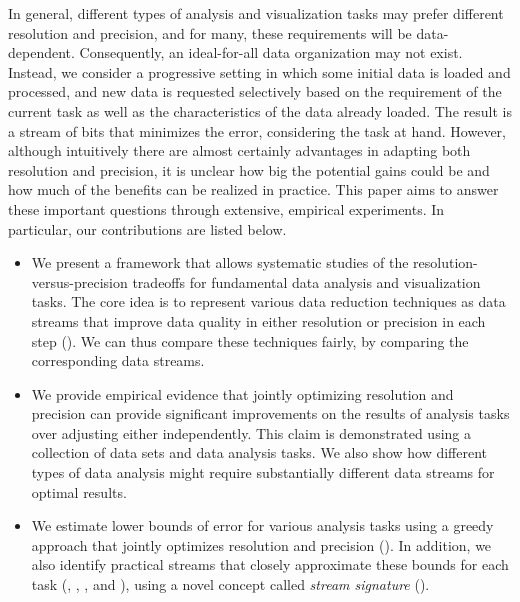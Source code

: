In general, different types of analysis and visualization tasks may prefer different
resolution and precision, and for many, these requirements will be
data-dependent. Consequently, an ideal-for-all data organization may not exist. 
Instead, we consider a progressive setting in which some initial data is loaded
and processed, and new data is requested selectively based on the requirement
of the current task as well as the characteristics of the data already loaded. The
result is a stream of bits that minimizes the error, considering the task at hand.
However, although intuitively there are almost certainly advantages in adapting
both resolution and precision, it is unclear how big the potential gains could
be   and how much of the benefits can be
realized in practice.  This paper aims to answer these important questions
through extensive, empirical experiments. In particular, our contributions are
listed below.

\begin{itemize}
%
\item We present a framework that allows systematic studies of the
resolution-versus-precision tradeoffs for fundamental data analysis and
visualization tasks. The core idea is to represent various data reduction
techniques as data streams that improve data quality in either resolution or
precision in each step (). We can
thus compare these techniques fairly, by comparing the corresponding data
streams.
%  
\item We provide empirical evidence that jointly optimizing resolution and
precision can provide significant improvements on the results of analysis tasks
over adjusting either independently.  This claim is demonstrated using a
collection of data sets and data analysis tasks. We also show how different
types of data analysis might require substantially different data streams for
optimal results.
%
\item We estimate lower bounds of error  for various analysis tasks using a greedy approach
that jointly optimizes resolution and precision ().
 In addition, we also identify practical streams that
closely approximate these bounds for each task (,
, , and ), using
a novel concept called \emph{stream signature} ().
\end{itemize}

